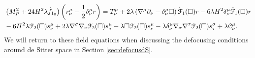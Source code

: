 \[
\label{eomdS}
\begin{aligned}&\left(M_{P}^{2}+24H^{2}\lambda\tilde{f}_{1_{0}}\right)\left(r_{\nu}^{\mu}-\frac{1}{2}\delta_{\nu}^{\mu}r\right) =T_{\nu}^{\mu}+2\lambda\left(\nabla^{\mu}\partial_{\nu}-\delta_{\nu}^{\mu}\square\right)\tilde{{\cal F}}_{1}(\Box)r-6\lambda H^{2}\delta_{\nu}^{\mu}\tilde{{\cal F}}_{1}(\Box)r\\
 & -6H^{2}\lambda{\cal F}_{2}(\Box)s_{\nu}^{\mu}+2\lambda\nabla^{\sigma}\nabla_{\nu}{\cal F}_{2}(\Box)s_{\sigma}^{\mu}-\lambda\square{\cal F}_{2}(\Box)s_{\nu}^{\mu}-\lambda\delta_{\nu}^{\mu}\nabla_{\sigma}\nabla^{\tau}{\cal F}_{2}(\Box)s_{\tau}^{\sigma} +\lambda{\cal C}_{\nu}^{\mu}.
\end{aligned}
 \]
 We will return to these field equations when discussing the defocusing conditions around de Sitter space in Section \ref{sec:defocusdS}.
%
